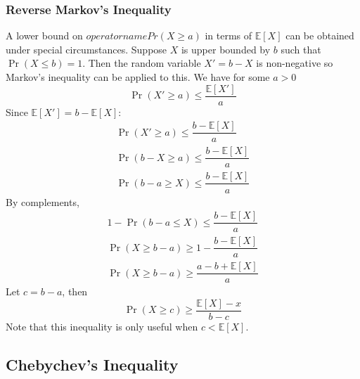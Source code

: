 \documentclass[11pt]{report} %
\begin{document}
\subsubsection{Reverse Markov's Inequality}

A lower bound on $operatorname{Pr}\left(X \geq a\right)$ in terms of $\mathbb{E}\left[X\right]$ can be obtained under special circumstances. Suppose $X$ is upper bounded by $b$ such that $\operatorname{Pr}\left(X \leq b\right) = 1$. Then the random variable $X' = b - X$ is non-negative so Markov's inequality can be applied to this. We have for some $a > 0$
\begin{equation}
\operatorname{Pr}\left(X' \geq a\right) \leq \dfrac{\mathbb{E}\left[X'\right]}{a}
\end{equation}
Since $\mathbb{E}\left[X'\right] = b - \mathbb{E}\left[X\right]$:
\begin{gather}
\operatorname{Pr}\left(X' \geq a\right) \leq \dfrac{b - \mathbb{E}\left[X\right]}{a} \\
\operatorname{Pr}\left(b - X \geq a\right) \leq \dfrac{b - \mathbb{E}\left[X\right]}{a} \\
\operatorname{Pr}\left(b - a \geq X\right) \leq \dfrac{b - \mathbb{E}\left[X\right]}{a}
\end{gather}
By complements,
\begin{gather}
1 - \operatorname{Pr}\left(b - a \leq X\right) \leq \dfrac{b - \mathbb{E}\left[X\right]}{a} \\
\operatorname{Pr}\left(X \geq b - a\right) \geq 1 - \dfrac{b - \mathbb{E}\left[X\right]}{a} \\
\operatorname{Pr}\left(X \geq b - a\right) \geq \dfrac{a - b + \mathbb{E}\left[X\right]}{a}
\end{gather}
Let $c = b - a$, then
\begin{equation}
\operatorname{Pr}\left(X \geq c\right) \geq \dfrac{\mathbb{E}\left[X\right] - x}{b - c}
\end{equation}
Note that this inequality is only useful when $c < \mathbb{E}\left[X\right]$.

\subsection{Chebychev's Inequality}
\end{document}
